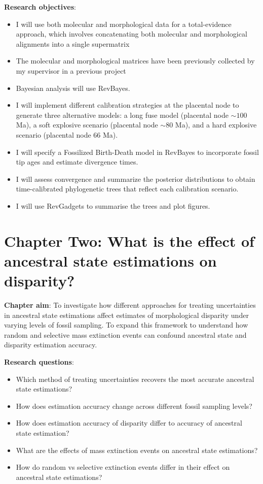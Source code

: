\documentclass[titlepage]{article}
\begin{document}
\noindent\textbf{Research objectives}: 
\begin{itemize}
    \item I will use both molecular and morphological data for a total-evidence approach, which involves concatenating both molecular and morphological alignments into a single supermatrix
    \item The molecular and morphological matrices have been previously collected by my supervisor in a previous project
    \item Bayesian analysis will use RevBayes. 
    \item I will implement different calibration strategies at the placental node to generate three alternative models: a long fuse model (placental node $\sim100$ Ma), a soft explosive scenario (placental node $\sim80$ Ma), and a hard explosive scenario (placental node 66 Ma).
    \item I will specify a Fossilized Birth-Death model in RevBayes to incorporate fossil tip ages and estimate divergence times.
    \item I will assess convergence and summarize the posterior distributions to obtain time-calibrated phylogenetic trees that reflect each calibration scenario.
    \item I will use RevGadgets to summarise the trees and plot figures.
\end{itemize} %
    

\section{Chapter Two: What is the effect of ancestral state estimations on disparity?}
\textbf{Chapter aim}: To investigate how different approaches for treating uncertainties in ancestral state estimations affect estimates of morphological disparity under varying levels of fossil sampling. 
To expand this framework to understand how random and selective mass extinction events can confound ancestral state and disparity estimation accuracy.

\noindent\textbf{Research questions}:
\begin{itemize}
    \item Which method of treating uncertainties recovers the most accurate ancestral state estimations?
    \item How does estimation accuracy change across different fossil sampling levels?
    \item How does estimation accuracy of disparity differ to accuracy of ancestral state estimation?
    \item What are the effects of mass extinction events on ancestral state estimations? 
    \item How do random vs selective extinction events differ in their effect on ancestral state estimations?
\end{itemize}
\end{document}
